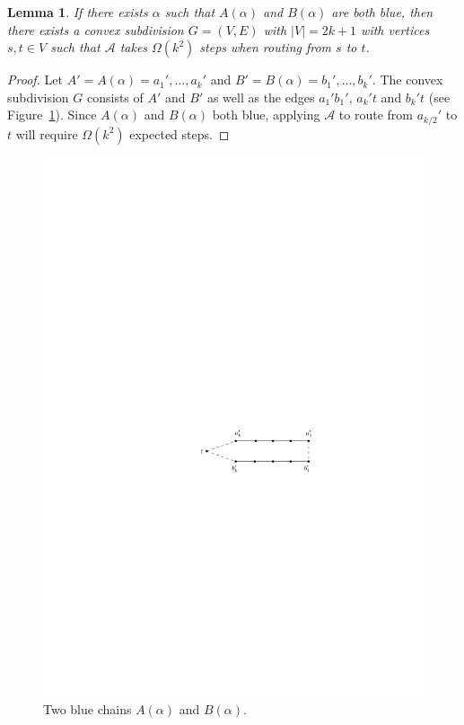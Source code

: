 \documentclass{elsarticle}
\newtheorem{lemma}{Lemma}%
\begin{document}
\begin{lemma}\label{lem:2blue}
If there exists $\alpha$ such that $A(\alpha)$ and $B(\alpha)$ are both blue, then there exists a convex subdivision $G=(V,E)$ with $|V|=2k+1$ with vertices $s,t\in V$ such that $\mathcal{A}$ takes $\Omega(k^2)$ steps when routing from $s$ to $t$.  
\end{lemma} 

\begin{proof}
Let $A'=A(\alpha)=a_1',\ldots,a_k'$ and $B'=B(\alpha)=b_1',\ldots,b_k'$.  The convex subdivision $G$ consists of $A'$ and $B'$ as well as the edges $a_1'b_1'$, $a_k't$ and $b_k't$ (see Figure~\ref{fig:2blue}).  Since $A(\alpha)$ and $B(\alpha)$ both blue, applying $\mathcal{A}$ to route from $a_{k/2}'$ to $t$ will require $\Omega(k^2)$ expected steps.
\end{proof}

\begin{figure}
  \centering
  \includegraphics{pics/2blue.pdf}
  \caption{Two blue chains $A(\alpha)$ and $B(\alpha)$.}
  \label{fig:2blue}
\end{figure}
\end{document}
